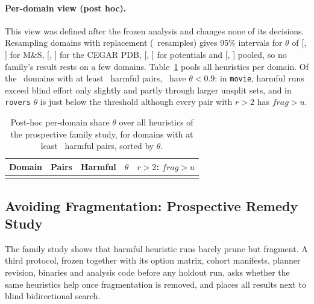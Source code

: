 \documentclass[letterpaper]{article}
\newcommand{\fragfactor}{\ensuremath{\mathit{frag}}}
\theoremstyle{plain}
\theoremstyle{definition}
\theoremstyle{remark}
\begin{document}
\paragraph{Per-domain view (post hoc).}
This view was defined after the frozen analysis and changes none of its
decisions.  Resampling domains with replacement (\GenBootstrapResamples\
resamples) gives 95\% intervals for $\theta$ of [\GenMsBootLow, \GenMsBootHigh]
for M\&S, [\GenPdbBootLow, \GenPdbBootHigh] for the CEGAR PDB,
[\GenPotBootLow, \GenPotBootHigh] for potentials and [\GenAllBootLow,
\GenAllBootHigh] pooled, so no family's result rests on a few domains.
Table~\ref{tab:supp-harm-domains} pools all heuristics per domain.  Of the
\GenDomainsShown\ domains with at least \GenDomainMinHarmful\ harmful pairs,
\GenDomainsBelow\ have $\theta<0.9$: in \texttt{movie}, harmful runs exceed
blind effort only slightly and partly through larger unsplit sets, and in
\texttt{rovers} $\theta$ is just below the threshold although every pair with
$r>2$ has $\fragfactor>u$.

\begin{table}[tb]
  \centering
  \small
  \begin{tabular}{lrrrr}
    \toprule
    Domain & Pairs & Harmful & $\theta$ & $r>2$: $\fragfactor>u$ \\
    \midrule
    \GenDomainRows
    \bottomrule
  \end{tabular}
  \caption{Post-hoc per-domain share $\theta$ over all heuristics of the
    prospective family study, for domains with at least
    \GenDomainMinHarmful\ harmful pairs, sorted by $\theta$.}
  \label{tab:supp-harm-domains}
\end{table}

\FloatBarrier
\subsection{Avoiding Fragmentation: Prospective Remedy Study}
\label{sec:supp-remedy}

The family study shows that harmful heuristic runs barely prune but
fragment.  A third protocol, frozen together with its option matrix, cohort manifests, planner revision,
binaries and analysis code before any holdout run, asks whether the same
heuristics help once fragmentation is removed, and places all results next
to blind bidirectional search.
\end{document}
